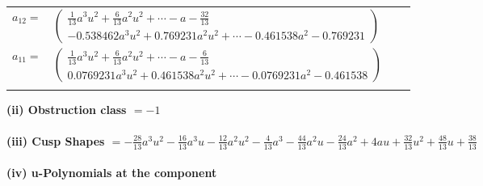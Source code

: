 \documentclass[1p]{elsarticle_modified}
\theoremstyle{definition}
\begin{document}
\begin{tabular}{m{7pt} m{180pt} m{7pt} m{180pt} }
\flushright $a_{12}=$&$\begin{pmatrix}\frac{1}{13} a^3 u^2+\frac{6}{13} a^2 u^2+\cdots- a-\frac{32}{13}\\-0.538462 a^{3} u^{2}+0.769231 a^{2} u^{2}+\cdots-0.461538 a^{2}-0.769231\end{pmatrix}$ \\
\flushright $a_{11}=$&$\begin{pmatrix}\frac{1}{13} a^3 u^2+\frac{6}{13} a^2 u^2+\cdots- a-\frac{6}{13}\\0.0769231 a^{3} u^{2}+0.461538 a^{2} u^{2}+\cdots-0.0769231 a^{2}-0.461538\end{pmatrix}$\\&\end{tabular}
\flushleft \textbf{(ii) Obstruction class $= -1$}\\~\\
\flushleft \textbf{(iii) Cusp Shapes $= -\frac{28}{13} a^3 u^2-\frac{16}{13} a^3 u-\frac{12}{13} a^2 u^2-\frac{4}{13} a^3-\frac{44}{13} a^2 u-\frac{24}{13} a^2+4 a u+\frac{32}{13} u^2+\frac{48}{13} u+\frac{38}{13}$}\\~\\
\newpage\renewcommand{\arraystretch}{1}
\flushleft \textbf{(iv) u-Polynomials at the component}\newline \\
\end{document}
